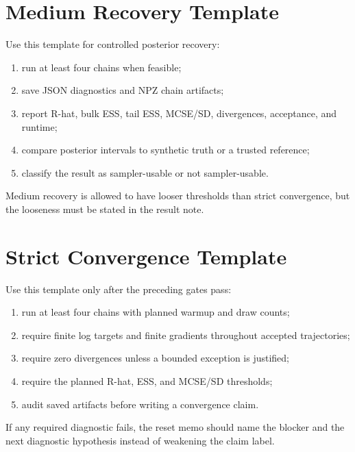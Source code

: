 \section{Medium Recovery Template}
\label{sec:bf-medium-recovery-template}

Use this template for controlled posterior recovery:
\begin{enumerate}[label=(\roman*)]
  \item run at least four chains when feasible;
  \item save JSON diagnostics and NPZ chain artifacts;
  \item report R-hat, bulk ESS, tail ESS, MCSE/SD, divergences, acceptance, and
    runtime;
  \item compare posterior intervals to synthetic truth or a trusted reference;
  \item classify the result as sampler-usable or not sampler-usable.
\end{enumerate}
Medium recovery is allowed to have looser thresholds than strict convergence,
but the looseness must be stated in the result note.

\section{Strict Convergence Template}
\label{sec:bf-strict-convergence-template}

Use this template only after the preceding gates pass:
\begin{enumerate}[label=(\roman*)]
  \item run at least four chains with planned warmup and draw counts;
  \item require finite log targets and finite gradients throughout accepted
    trajectories;
  \item require zero divergences unless a bounded exception is justified;
  \item require the planned R-hat, ESS, and MCSE/SD thresholds;
  \item audit saved artifacts before writing a convergence claim.
\end{enumerate}
If any required diagnostic fails, the reset memo should name the blocker and
the next diagnostic hypothesis instead of weakening the claim label.
